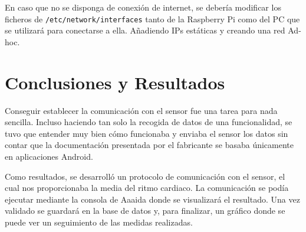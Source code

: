 En caso que no se disponga de conexión de internet, se debería modificar los ficheros de \texttt{/etc/network/interfaces} tanto de la Raspberry Pi como del PC que se utilizará para conectarse a ella. Añadiendo IPs estáticas y creando una red Ad-hoc. 


\section{Conclusiones y Resultados}

Conseguir establecer la comunicación con el sensor fue una tarea para nada sencilla. Incluso haciendo tan solo la recogida de datos de una funcionalidad, se tuvo que entender muy bien cómo funcionaba y enviaba el sensor los datos sin contar que la documentación presentada por el fabricante se basaba únicamente en aplicaciones Android. 

Como resultados, se desarrolló un protocolo de comunicación con el sensor, el cual nos proporcionaba la media  del ritmo cardiaco. La comunicación se podía ejecutar mediante la consola de Aaaida donde se visualizará el resultado. Una vez validado se guardará en la base de datos y, para finalizar, un gráfico donde se puede ver un seguimiento de las medidas realizadas.

